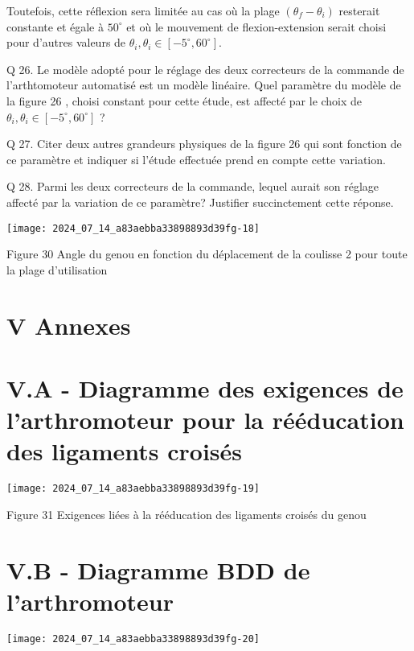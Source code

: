 Toutefois, cette réflexion sera limitée au cas où la plage $\left(\theta_{f}-\theta_{i}\right)$ resterait constante et égale à $50^{\circ}$ et où le mouvement de flexion-extension serait choisi pour d'autres valeurs de $\theta_{i}, \theta_{i} \in\left[-5^{\circ}, 60^{\circ}\right]$.

Q 26. Le modèle adopté pour le réglage des deux correcteurs de la commande de l'arthtomoteur automatisé est un modèle linéaire. Quel paramètre du modèle de la figure 26 , choisi constant pour cette étude, est affecté par le choix de $\theta_{i}, \theta_{i} \in\left[-5^{\circ}, 60^{\circ}\right]$ ?

Q 27. Citer deux autres grandeurs physiques de la figure 26 qui sont fonction de ce paramètre et indiquer si l'étude effectuée prend en compte cette variation.

Q 28. Parmi les deux correcteurs de la commande, lequel aurait son réglage affecté par la variation de ce paramètre? Justifier succinctement cette réponse.

\begin{center}
\texttt{[image: 2024\_07\_14\_a83aebba33898893d39fg-18]}
\end{center}

Figure 30 Angle du genou en fonction du déplacement de la coulisse 2 pour toute la plage d'utilisation

\section*{V Annexes}
\section*{V.A - Diagramme des exigences de l'arthromoteur pour la rééducation des ligaments croisés}
\begin{center}
\texttt{[image: 2024\_07\_14\_a83aebba33898893d39fg-19]}
\end{center}

Figure 31 Exigences liées à la rééducation des ligaments croisés du genou

\section*{V.B - Diagramme BDD de l'arthromoteur}
\begin{center}
\texttt{[image: 2024\_07\_14\_a83aebba33898893d39fg-20]}
\end{center}

